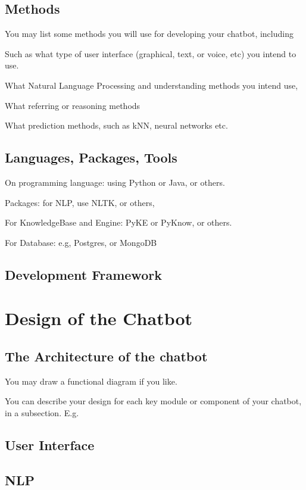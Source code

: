 \documentclass[11pt]{article}
\begin{document}
	\subsection{Methods}
	
	You may list some methods you will use for developing your chatbot, including 
	
	Such as what type of user interface (graphical, text, or voice, etc) you intend to use.
	
	What Natural Language Processing and understanding methods you intend use, 
	
	What referring or reasoning methods
	
	What prediction methods, such as kNN, neural networks etc. 
	
	\subsection{Languages, Packages, Tools}
	
	On programming language: using Python or Java, or others. 
	
	Packages: for NLP, use NLTK\citep{NLTK}, or others, 
	
	For KnowledgeBase and Engine: PyKE or PyKnow, or others. 
	
	For Database: e.g, Postgres, or MongoDB     
	
	\subsection{Development Framework}
	
	
	\section{Design of the Chatbot}
	
	
	\subsection{The Architecture of the chatbot}
	You may draw a functional diagram if you like.  
	
	You can describe your design for each key module or component of your chatbot, in a subsection. E.g. 
	\subsection{User Interface} 
	
	\subsection{NLP}
	
\end{document}

